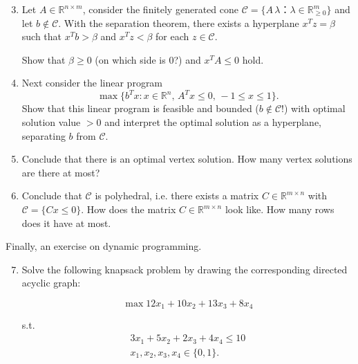 \documentclass[11pt,a4paper]{article}
\begin{document}
\begin{enumerate}
  \setcounter{enumi}{2}
\item Let $A ∈ ℝ^{n ×m}$, consider the finitely generated cone $\mathscr{C} = \{ A\,  λ ： λ ∈ ℝ^m_{≥0}\}$ and let $b ∉ \mathscr{C} $. With the separation theorem, there exists a hyperplane $x^T z = β$ such that $x^T b > β$ and $x^T z < β$ for each $z ∈  \mathscr{C}$.

  Show that $β≥0$ (on which side is $0$?)  and  $x^T A ≤ 0$ hold.

\item Next consider the linear program
  \begin{displaymath}
     \max\{ b^T x : x ∈ ℝ^n, \,  A^T x ≤ 0, \,  -1 ≤ x ≤ 1\}. 
   \end{displaymath}
   Show that this linear program is feasible and bounded ($b ∉ \mathscr{C}$!) with optimal solution value $>0$ and interpret the optimal solution as a hyperplane, separating $b$ from $\mathscr{C}$. 
 \item Conclude that there is an optimal vertex solution. How many vertex solutions are there at most?
 \item Conclude that $ \mathscr{C}$ is polyhedral, i.e. there exists a matrix $C ∈ ℝ^{m ×n}$ with $\mathscr{C} = \{ Cx ≤0\}$. How does the matrix $C ∈ ℝ^{m ×n}$ look like. How many rows does it have at most. 
   
\end{enumerate}
Finally, an exercise on dynamic programming. 
\begin{enumerate}
  \setcounter{enumi}{6}
\item 
  Solve the following knapsack problem by drawing the corresponding directed acyclic graph:

  \begin{displaymath}
    \max 12x_1 + 10 x_2 + 13 x_3 + 8 x_4 
  \end{displaymath}

  s.t.
  \begin{eqnarray*}
    3x_1 + 5 x_2 + 2 x_3 + 4 x_4 ≤ 10\\
    x_1,x_2,x_3,x_4 ∈ \{0,1\}. 
  \end{eqnarray*}
  
\end{enumerate}

%
%


 
\end{document}
